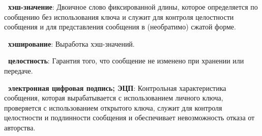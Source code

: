 {\bf \thedefctr~хэш-значение}:
Двоичное слово фиксированной длины, 
которое определяется по сообщению без использования ключа и 
служит для контроля целостности сообщения и для представления 
сообщения в (необратимо) сжатой форме.

{\bf \thedefctr~хэширование}:
Выработка хэш-значений.

{\bf \thedefctr~целостность}:
Гарантия того, что сообщение не изменено
при хранении или передаче.

{\bf \thedefctr~электронная цифровая подпись; ЭЦП}:
Контрольная характеристика сообщения, которая 
вырабатывается с использованием личного ключа,
проверяется с использованием открытого ключа,
служит для контроля целостности и подлинности сообщения
и обеспечивает невозможность отказа от авторства.


